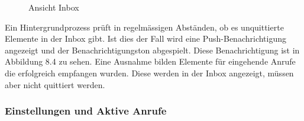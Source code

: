 \begin{figure}[h]
\begin{minipage}[b]{0.45\textwidth}
        \caption{Ansicht Inbox}
    \end{minipage}
    \label{fig:MobileClient-Screens2}
\end{figure}

Ein Hintergrundprozess prüft in regelmässigen Abständen, ob es unquittierte Elemente in der Inbox gibt.
Ist dies der Fall wird eine Push-Benachrichtigung angezeigt und der Benachrichtigungston abgespielt.
Diese Benachrichtigung ist in Abbildung 8.4 zu sehen.
Eine Ausnahme bilden Elemente für eingehende Anrufe die erfolgreich empfangen wurden.
Diese werden in der Inbox angezeigt, müssen aber nicht quittiert werden.

\clearpage

\subsubsection*{Einstellungen und Aktive Anrufe}

